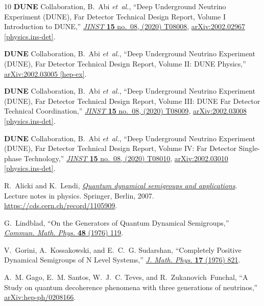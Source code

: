 \documentclass[aps, prd, onecolumn, tightenlines, notitlepage, superscriptaddress, nofootinbib, preprintnumbers, floatfix,showkeys,11pt]{revtex4-2}
\begin{document}
\begin{thebibliography}{10}
{\bfseries DUNE} Collaboration, B.~Abi {\em et~al.}, ``{Deep Underground
  Neutrino Experiment (DUNE), Far Detector Technical Design Report, Volume I
  Introduction to DUNE},''
  \href{http://dx.doi.org/10.1088/1748-0221/15/08/T08008}{{\em JINST}
  {\bfseries 15} no.~08, (2020) T08008},
  \href{http://arxiv.org/abs/2002.02967}{{\ttfamily arXiv:2002.02967
  [physics.ins-det]}}.

{\bfseries DUNE} Collaboration, B.~Abi {\em et~al.}, ``{Deep Underground
  Neutrino Experiment (DUNE), Far Detector Technical Design Report, Volume II:
  DUNE Physics},'' \href{http://arxiv.org/abs/2002.03005}{{\ttfamily
  arXiv:2002.03005 [hep-ex]}}.

{\bfseries DUNE} Collaboration, B.~Abi {\em et~al.}, ``{Deep Underground
  Neutrino Experiment (DUNE), Far Detector Technical Design Report, Volume III:
  DUNE Far Detector Technical Coordination},''
  \href{http://dx.doi.org/10.1088/1748-0221/15/08/T08009}{{\em JINST}
  {\bfseries 15} no.~08, (2020) T08009},
  \href{http://arxiv.org/abs/2002.03008}{{\ttfamily arXiv:2002.03008
  [physics.ins-det]}}.

{\bfseries DUNE} Collaboration, B.~Abi {\em et~al.}, ``{Deep Underground
  Neutrino Experiment (DUNE), Far Detector Technical Design Report, Volume IV:
  Far Detector Single-phase Technology},''
  \href{http://dx.doi.org/10.1088/1748-0221/15/08/T08010}{{\em JINST}
  {\bfseries 15} no.~08, (2020) T08010},
  \href{http://arxiv.org/abs/2002.03010}{{\ttfamily arXiv:2002.03010
  [physics.ins-det]}}.

R.~Alicki and K.~Lendi, \href{http://dx.doi.org/10.1007/3-540-70861-8}{{\em
  {Quantum dynamical semigroups and applications}}}.
\newblock Lecture notes in physics. Springer, Berlin, 2007.
\newblock \url{https://cds.cern.ch/record/1105909}.

G.~Lindblad, ``{On the Generators of Quantum Dynamical Semigroups},''
  \href{http://dx.doi.org/10.1007/BF01608499}{{\em Commun. Math. Phys.}
  {\bfseries 48} (1976) 119}.

V.~Gorini, A.~Kossakowski, and E.~C.~G. Sudarshan, ``{Completely Positive
  Dynamical Semigroups of N Level Systems},''
  \href{http://dx.doi.org/10.1063/1.522979}{{\em J. Math. Phys.} {\bfseries 17}
  (1976) 821}.

A.~M. Gago, E.~M. Santos, W.~J.~C. Teves, and R.~Zukanovich~Funchal, ``{A Study
  on quantum decoherence phenomena with three generations of neutrinos},''
  \href{http://arxiv.org/abs/hep-ph/0208166}{{\ttfamily arXiv:hep-ph/0208166}}.


\end{thebibliography}
\end{document}
